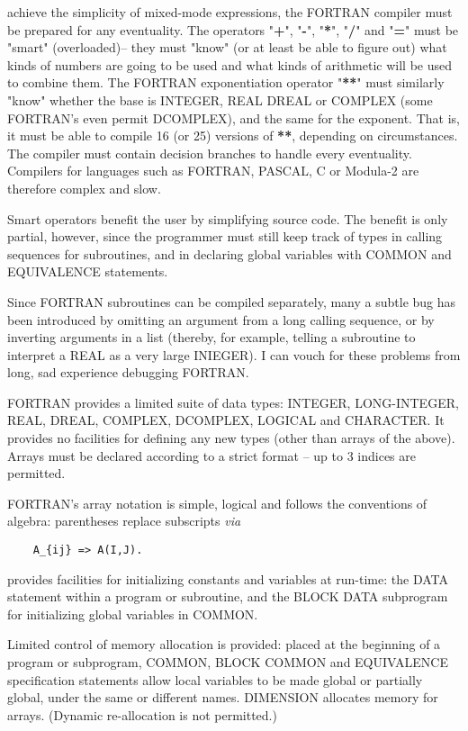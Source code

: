  achieve the simplicity of mixed-mode expressions, the FORTRAN compiler must be prepared for any eventuality. The operators "\textbf{+}", "\textbf{-}", "\textbf{*}", "\textbf{/}" and "\textbf{=}" must be "smart" (overloaded)-- they must "know" (or at least be able to figure out) what kinds of numbers are going to be used and what kinds of arithmetic will be used to combine them. The FORTRAN exponentiation operator "\textbf{**}" must similarly "know" whether the base is INTEGER, REAL DREAL or COMPLEX (some FORTRAN's even permit DCOMPLEX), and the same for the exponent. That is, it must be able to compile 16 (or 25) versions of \textbf{**}, depending on circumstances. The compiler must contain decision branches to handle every eventuality. Compilers for languages such as FORTRAN, PASCAL, C or Modula-2 are therefore complex and slow.

Smart operators benefit the user by simplifying source code. The benefit is only partial, however, since the programmer must still keep track of types in calling sequences for subroutines, and in declaring global variables with COMMON and EQUIVALENCE statements.
 
Since FORTRAN subroutines can be compiled separately, many a subtle bug has been introduced by omitting an argument from a long calling sequence, or by inverting arguments in a list (thereby, for example, telling a subroutine to interpret a REAL as a very large INIEGER). I can vouch for these problems from long, sad experience debugging FORTRAN.

FORTRAN provides a limited suite of data types: INTEGER, LONG-INTEGER, REAL, DREAL, COMPLEX, DCOMPLEX, LOGICAL and CHARACTER. It provides no facilities for defining any new types (other than arrays of the above). Arrays must be declared according to a strict format -- up to 3 indices are permitted.

FORTRAN's array notation is simple, logical and follows the conventions of algebra: parentheses replace subscripts \textit{via}

\begin{verbatim}
    A_{ij} => A(I,J).
\end{verbatim}

 provides facilities for initializing constants and variables at run-time: the DATA statement within a program or subroutine, and the BLOCK DATA subprogram for initializing global variables in COMMON.

Limited control of memory allocation is provided: placed at the beginning of a program or subprogram, COMMON, BLOCK COMMON and EQUIVALENCE specification statements allow local variables to be made global or partially global, under the same or different names. DIMENSION allocates memory for arrays. (Dynamic re-allocation is not permitted.)

